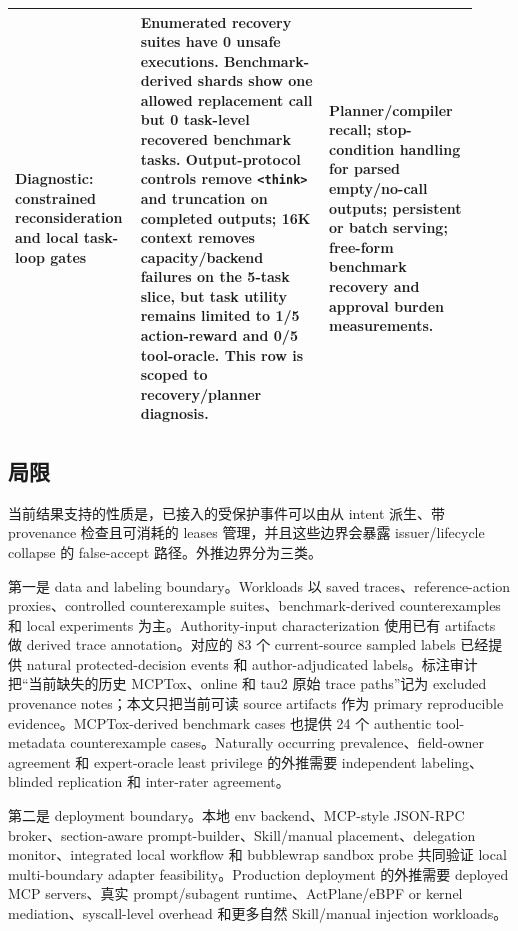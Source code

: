 \documentclass[UTF8,a4paper,11pt]{ctexart}
\begin{document}
\begin{table}[t]
\begin{tabular}{p{0.22\linewidth}p{0.39\linewidth}p{0.31\linewidth}}
Diagnostic: constrained reconsideration and local task-loop gates & Enumerated recovery suites have 0 unsafe executions. Benchmark-derived shards show one allowed replacement call but 0 task-level recovered benchmark tasks. Output-protocol controls remove \texttt{<think>} and truncation on completed outputs; 16K context removes capacity/backend failures on the 5-task slice, but task utility remains limited to 1/5 action-reward and 0/5 tool-oracle. This row is scoped to recovery/planner diagnosis. & Planner/compiler recall; stop-condition handling for parsed empty/no-call outputs; persistent or batch serving; free-form benchmark recovery and approval burden measurements. \\
\bottomrule
\end{tabular}
\end{table}

\subsection{局限}
当前结果支持的性质是，已接入的受保护事件可以由从 intent 派生、带 provenance 检查且可消耗的 leases 管理，并且这些边界会暴露 issuer/lifecycle collapse 的 false-accept 路径。外推边界分为三类。

第一是 data and labeling boundary。Workloads 以 saved traces、reference-action proxies、controlled counterexample suites、benchmark-derived counterexamples 和 local experiments 为主。Authority-input characterization 使用已有 artifacts 做 derived trace annotation。对应的 83 个 current-source sampled labels 已经提供 natural protected-decision events 和 author-adjudicated labels。标注审计把“当前缺失的历史 MCPTox、online 和 tau2 原始 trace paths”记为 excluded provenance notes；本文只把当前可读 source artifacts 作为 primary reproducible evidence。MCPTox-derived benchmark cases 也提供 24 个 authentic tool-metadata counterexample cases。Naturally occurring prevalence、field-owner agreement 和 expert-oracle least privilege 的外推需要 independent labeling、blinded replication 和 inter-rater agreement。

第二是 deployment boundary。本地 env backend、MCP-style JSON-RPC broker、section-aware prompt-builder、Skill/manual placement、delegation monitor、integrated local workflow 和 bubblewrap sandbox probe 共同验证 local multi-boundary adapter feasibility。Production deployment 的外推需要 deployed MCP servers、真实 prompt/subagent runtime、ActPlane/eBPF or kernel mediation、syscall-level overhead 和更多自然 Skill/manual injection workloads。
\end{document}
